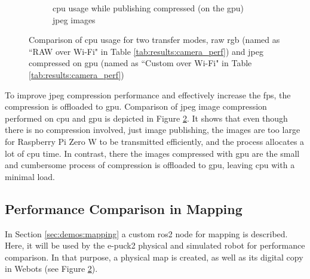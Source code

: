 \begin{figure}[H]
\begin{subfigure}{.8\textwidth}
  \caption{\ac{cpu} usage while publishing compressed (on the \ac{gpu}) \ac{jpeg} images}
  \label{fig:results:camera_load:jpeg_gpu}
\end{subfigure}
\caption[Comparison of \ac{cpu} usage for two transfer modes, raw \ac{rgb} and \ac{jpeg} compressed on \ac{gpu}]{Comparison of \ac{cpu} usage for two transfer modes, raw \ac{rgb} (named as ``RAW over Wi-Fi" in Table \ref{tab:results:camera_perf}) and \ac{jpeg} compressed on \ac{gpu} (named as ``Custom over Wi-Fi" in Table \ref{tab:results:camera_perf})}
\label{fig:results:camera_load}
\end{figure}

To improve \ac{jpeg} compression performance and effectively increase the \ac{fps}, the compression is offloaded to \ac{gpu}.
Comparison of \ac{jpeg} image compression performed on \ac{cpu} and \ac{gpu} is depicted in Figure \ref{fig:results:camera_load}.
It shows that even though there is no compression involved, just image publishing, the images are too large for Raspberry Pi Zero W to be transmitted efficiently, and the process allocates a lot of \ac{cpu} time.
In contrast, there the images compressed with \ac{gpu} are the small and cumbersome process of compression is offloaded to \ac{gpu}, leaving \ac{cpu} with a minimal load.

\subsection{Performance Comparison in Mapping}
In Section \ref{sec:demos:mapping} a custom \ac{ros2} node for mapping is described. Here, it will be used by the e-puck2 physical and simulated robot for performance comparison. In that purpose, a physical map is created, as well as its digital copy in Webots (see Figure \ref{fig:results:camera_load}).

